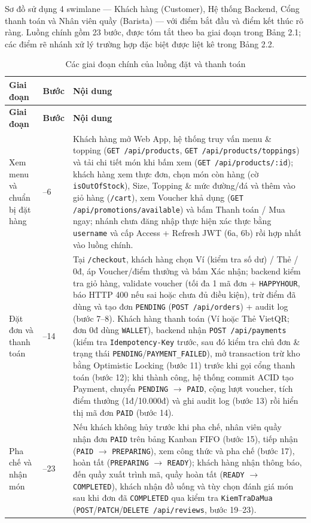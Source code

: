 \documentclass[12pt,a4paper]{report}
\begin{document}
Sơ đồ sử dụng 4 swimlane --- Khách hàng (Customer), Hệ thống Backend, Cổng thanh toán và Nhân viên quầy (Barista) --- với điểm bắt đầu và điểm kết thúc rõ ràng. Luồng chính gồm 23 bước, được tóm tắt theo ba giai đoạn trong Bảng 2.1; các điểm rẽ nhánh xử lý trường hợp đặc biệt được liệt kê trong Bảng 2.2.

\begin{longtable}{>{\raggedright\arraybackslash}p{3.2cm}>{\raggedright\arraybackslash}p{2.2cm}>{\raggedright\arraybackslash}p{9.6cm}}
\caption{Các giai đoạn chính của luồng đặt và thanh toán}\\
\hline
\rowcolor{gray!20} \textbf{Giai đoạn} & \textbf{Bước} & \textbf{Nội dung} \\
\hline
\endfirsthead
\hline
\rowcolor{gray!20} \textbf{Giai đoạn} & \textbf{Bước} & \textbf{Nội dung} \\
\hline
\endhead
Xem menu và chuẩn bị đặt hàng & 1--6 & Khách hàng mở Web App, hệ thống truy vấn menu \& topping (\texttt{GET /api/products}, \texttt{GET /api/products/toppings}) và tải chi tiết món khi bấm xem (\texttt{GET /api/products/:id}); khách hàng xem thực đơn, chọn món còn hàng (cờ \texttt{isOutOfStock}), Size, Topping \& mức đường/đá và thêm vào giỏ hàng (\texttt{/cart}), xem Voucher khả dụng (\texttt{GET /api/promotions/available}) và bấm Thanh toán / Mua ngay; nhánh chưa đăng nhập thực hiện xác thực bằng \texttt{username} và cấp Access + Refresh JWT (6a, 6b) rồi hợp nhất vào luồng chính. \\
\hline
Đặt đơn và thanh toán & 7--14 & Tại \texttt{/checkout}, khách hàng chọn Ví (kiểm tra số dư) / Thẻ / 0đ, áp Voucher/điểm thưởng và bấm Xác nhận; backend kiểm tra giỏ hàng, validate voucher (tối đa 1 mã đơn + \texttt{HAPPYHOUR}, báo HTTP 400 nếu sai hoặc chưa đủ điều kiện), trừ điểm đã dùng và tạo đơn \texttt{PENDING} (\texttt{POST /api/orders}) + audit log (bước 7--8). Khách hàng thanh toán (Ví hoặc Thẻ VietQR; đơn 0đ dùng \texttt{WALLET}), backend nhận \texttt{POST /api/payments} (kiểm tra \texttt{Idempotency-Key} trước, sau đó kiểm tra chủ đơn \& trạng thái \texttt{PENDING}/\texttt{PAYMENT\_FAILED}), mở transaction trừ kho bằng Optimistic Locking (bước 11) trước khi gọi cổng thanh toán (bước 12); khi thành công, hệ thống commit ACID tạo Payment, chuyển \texttt{PENDING} $\rightarrow$ \texttt{PAID}, cộng lượt voucher, tích điểm thưởng (1đ/10.000đ) và ghi audit log (bước 13) rồi hiển thị mã đơn \texttt{PAID} (bước 14). \\
\hline
Pha chế và nhận món & 15--23 & Nếu khách không hủy trước khi pha chế, nhân viên quầy nhận đơn \texttt{PAID} trên bảng Kanban FIFO (bước 15), tiếp nhận (\texttt{PAID} $\rightarrow$ \texttt{PREPARING}), xem công thức và pha chế (bước 17), hoàn tất (\texttt{PREPARING} $\rightarrow$ \texttt{READY}); khách hàng nhận thông báo, đến quầy xuất trình mã, quầy hoàn tất (\texttt{READY} $\rightarrow$ \texttt{COMPLETED}), khách nhận đồ uống và tùy chọn đánh giá món sau khi đơn đã \texttt{COMPLETED} qua kiểm tra \texttt{KiemTraDaMua} (\texttt{POST}/\texttt{PATCH}/\texttt{DELETE /api/reviews}, bước 19--23). \\
\hline
\end{longtable}
\end{document}
